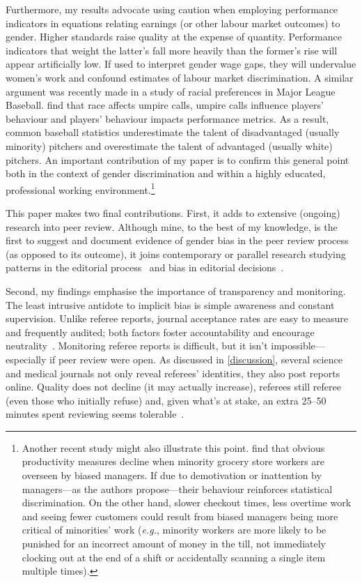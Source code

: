 Furthermore, my results advocate using caution when employing performance indicators in equations relating earnings (or other labour market outcomes) to gender. Higher standards raise quality at the expense of quantity. Performance indicators that weight the latter's fall more heavily than the former's rise will appear artificially low. If used to interpret gender wage gaps, they will undervalue women's work and confound estimates of labour market discrimination. A similar argument was recently made in a study of racial preferences in Major League Baseball. \citet{Parsons2011} find that race affects umpire calls, umpire calls influence players' behaviour and players' behaviour impacts performance metrics. As a result, common baseball statistics underestimate the talent of disadvantaged (usually minority) pitchers and overestimate the talent of advantaged (usually white) pitchers. An important contribution of my paper is to confirm this general point both in the context of gender discrimination and within a highly educated, professional working environment.\footnote{Another recent study might also illustrate this point. \citet{Glover2017} find that obvious productivity measures decline when minority grocery store workers are overseen by biased managers. If due to demotivation or inattention by managers---as the authors propose---their behaviour reinforces statistical discrimination. On the other hand, slower checkout times, less overtime work and seeing fewer customers could result from biased managers being more critical of minorities' work (\emph{e.g.}, minority workers are more likely to be punished for an incorrect amount of money in the till, not immediately clocking out at the end of a shift or accidentally scanning a single item multiple times).}

This paper makes two final contributions. First, it adds to extensive (ongoing) research into peer review. Although mine, to the best of my knowledge, is the first to suggest and document evidence of gender bias in the peer review process (as opposed to its outcome), it joins contemporary or parallel research studying patterns in the editorial process~\citep{Ellison2002a,Card2013,Clain2017} and bias in editorial decisions~\citep{Abrevaya2012,Card2017,Bransch2017}.

Second, my findings emphasise the importance of transparency and monitoring. The least intrusive antidote to implicit bias is simple awareness and constant supervision. Unlike referee reports, journal acceptance rates are easy to measure and frequently audited; both factors foster accountability and encourage neutrality~\citep{Foschi1996}. Monitoring referee reports is difficult, but it isn't impossible---especially if peer review were open. As discussed in \autoref{discussion}, several science and medical journals not only reveal referees' identities, they also post reports online. Quality does not decline (it may actually increase), referees still referee (even those who initially refuse) and, given what's at stake, an extra 25--50 minutes spent reviewing seems tolerable~\citep{vanRooyen1999,vanRooyen2010,Walsh2000}.

